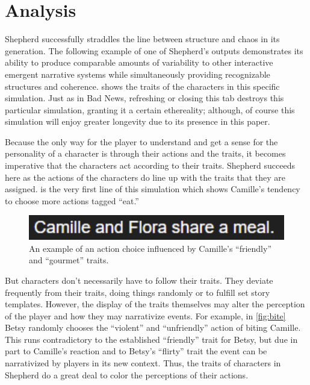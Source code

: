 \documentclass[letterpaper]{article}
\begin{document}
\section{Analysis}
Shepherd successfully straddles the line between structure and chaos in its generation.
The following example of one of Shepherd’s outputs demonstrates its ability to produce
comparable amounts of variability to other interactive emergent narrative systems while
simultaneously providing recognizable structures and coherence.  shows the
traits of the characters in this specific simulation. Just as in Bad News, refreshing or
closing this tab destroys this particular simulation, granting it a certain ethereality;
although, of course this simulation will enjoy greater longevity due to its presence in
this paper.

Because the only way for the player to understand and get a sense for the personality of a
character is through their actions and the traits, it becomes imperative that the
characters act according to their traits. Shepherd succeeds here as the actions of the
characters do line up with the traits that they are assigned.  is the
very first line of this simulation which shows Camille’s tendency to choose more actions
tagged “eat.”

\begin{figure}[h]
    \centering
    \includegraphics[width=\columnwidth]{figure-cf_eat}
    \caption{An example of an action choice influenced by Camille's ``friendly'' and
    ``gourmet'' traits.}
    \label{fig:eat}
\end{figure}

But characters don’t necessarily have to follow their traits. They deviate frequently from
their traits, doing things randomly or to fulfill set story templates. However, the
display of the traits themselves may alter the perception of the player and how they may
narrativize events. For example, in \cref{fig:bite} Betsy randomly chooses the “violent”
and “unfriendly” action of biting Camille. This runs contradictory to the established
“friendly” trait for Betsy, but due in part to Camille’s reaction and to Betsy’s “flirty”
trait the event can be narrativized by players in its new context. Thus, the traits of
characters in Shepherd do a great deal to color the perceptions of their actions.
\end{document}
